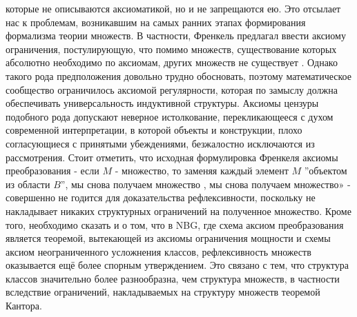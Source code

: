 \documentclass[12pt]{article}
\begin{document}
которые не описываются аксиоматикой, но и не запрещаются ею. Это отсылает нас к проблемам, возникавшим на самых ранних этапах формирования формализма теории множеств. В частности, Френкель предлагал ввести аксиому ограничения, постулирующую, что помимо множеств, существование которых абсолютно необходимо по аксиомам, других множеств не существует \cite{fraenkel-restriction-axiom}. Однако такого рода предположения довольно трудно обосновать, поэтому математическое сообщество ограничилось аксиомой регулярности, которая по замыслу должна обеспечивать универсальность индуктивной структуры. Аксиомы цензуры подобного рода допускают неверное истолкование, перекликающееся с духом современной интерпретации, в которой объекты и конструкции, плохо согласующиеся с принятыми убеждениями, безжалостно исключаются из рассмотрения. Стоит отметить, что исходная формулировка Френкеля аксиомы преобразования - если $M$ - множество, то заменяя каждый элемент $M$ ''объектом из области $B$'', мы снова получаем множество \cite{fraenkel-replacement-axiom}, мы снова получаем множество» \cite{fraenkel-replacement-axiom} - совершенно не годится для доказательства рефлексивности, поскольку не накладывает никаких структурных ограничений на полученное множество. Кроме того, необходимо сказать и о том, что в NBG, где схема аксиом преобразования является теоремой, вытекающей из аксиомы ограничения мощности и схемы аксиом неограниченного усложнения классов, рефлексивность множеств оказывается ещё более спорным утверждением. Это связано с тем, что структура классов значительно более разнообразна, чем структура множеств, в частности вследствие ограничений, накладываемых на структуру множеств теоремой Кантора.
\end{document}
